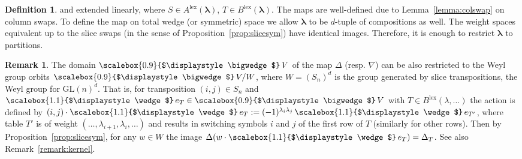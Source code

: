 \documentclass[12pt, reqno]{amsart}
\theoremstyle{definition}
\newtheorem{definition}[theorem]{Definition}
\newtheorem{remark}{Remark}[section]
\newcommand{\lex}{\mathrm{lex}}
\let\oldbigwedge\bigwedge
\let\oldbigvee\bigvee
\let\oldwedge\wedge
\renewcommand{\bigwedge}{
  \mathop{
    \vcenter{
      \hbox{\scalebox{0.9}{$\displaystyle\oldbigwedge$}}
    }
  }
}
\renewcommand{\bigvee}{
  \mathop{
    \vcenter{
      \hbox{\scalebox{0.9}{$\displaystyle\oldbigvee$}}
    }
  }
}
\renewcommand{\wedge}{
  \mathop{
    \vcenter{
      \hbox{\scalebox{1.1}{$\displaystyle\oldwedge$}}
    }
  }
}
\begin{document}
\begin{definition}
    and extended linearly, where $S \in A^\lex(\pmb{\lambda})$, $T \in B^\lex(\pmb{\lambda})$. The maps are well-defined due to  Lemma~\ref{lemma:colswap} on column swaps. To define the map on total wedge (or symmetric) space we allow $\pmb{\lambda}$ to be $d$-tuple of compositions as well. The weight spaces equivalent up to the slice swaps (in the sense of Proposition~\ref{prop:slicesym}) have identical images. Therefore, it is enough to restrict $\pmb{\lambda}$ to partitions. 
\end{definition}

\begin{remark}\label{remark:domain}
The domain $\bigwedge V$ of the map $\Delta$ (resp. $\nabla$) can be also restricted to the Weyl group orbits $\bigwedge V/W$, where $W = (S_n)^d$ is the group generated by slice transpositions, the Weyl group for $\mathrm{GL}(n)^d$. 
That is, for transposition $(i,j) \in S_n$ and $\wedge e_T \in \bigwedge V$ with $T \in B^{\mathrm{lex}}(\lambda,\ldots)$ the action is defined by $(i,j) \cdot \wedge e_T := (-1)^{\lambda_i \lambda_j}\wedge e_{T'}$, where table $T'$ is of weight $(\ldots,\lambda_{i+1},\lambda_i,\ldots)$ and results in switching symbols $i$ and $j$ of the first row of $T$ (similarly for other rows). Then by Proposition~\ref{prop:slicesym}, for any $w \in W$ the image $\Delta(w \cdot \wedge e_T) = \Delta_T$.
See also Remark~\ref{remark:kernel}.
\end{remark}
\end{document}
